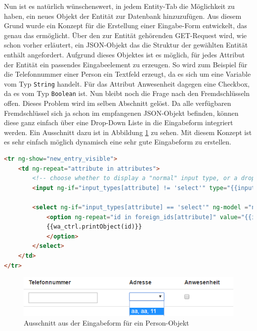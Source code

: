 Nun ist es natürlich wünschenswert, in jedem Entity-Tab die Möglichkeit zu haben, ein neues Objekt der Entität zur Datenbank hinzuzufügen. Aus diesem Grund wurde ein Konzept für die Erstellung einer Eingabe-Form entwickelt, das genau das ermöglicht. Über den zur Entität gehörenden GET-Request wird, wie schon vorher erläutert, ein JSON-Objekt das die Struktur der gewählten Entität enthält angefordert. Aufgrund dieses Objektes ist es möglich, für jedes Attribut der Entität ein passendes Eingabeelement zu erzeugen. So wird zum Beispiel für die Telefonnummer einer Person ein Textfeld erzeugt, da es sich um eine Variable vom Typ \verb|String| handelt. Für das Attribut Anwesenheit dagegen eine Checkbox, da es vom Typ \verb|Boolean| ist. Nun bleibt noch die Frage nach den Fremdschlüsseln offen. Dieses Problem wird im selben Abschnitt gelöst. Da alle verfügbaren Fremdschlüssel sich ja schon im empfangenen JSON-Objekt befinden, können diese ganz einfach über eine Drop-Down Liste in die Eingabeform integriert werden. Ein Ausschnitt dazu ist in Abbildung \ref{fig:input_form} zu sehen. Mit diesem Konzept ist es sehr einfach möglich dynamisch eine sehr gute Eingabeform zu erstellen.

\scriptsize
\begin{lstlisting}[caption=Erstellung der Eingabeform in index.html, label=cs:input_form, language=HTML]
<tr ng-show="new_entry_visible">
	<td ng-repeat="attribute in attributes">
		<!-- choose whether to display a "normal" input type, or a dropdown-list-->
		<input ng-if="input_types[attribute] != 'select'" type="{{input_types[attribute]}}" name="{{attribute}}" ng-model="new_db_object[attribute]" />
		
		<select ng-if="input_types[attribute] == 'select'" ng-model ="new_db_object[attribute]">
			<option ng-repeat="id in foreign_ids[attribute]" value="{{id}}">
			{{wa_ctrl.printObject(id)}}
			</option>
		</select>
	</td>
</tr>
\end{lstlisting}
\normalsize 

\begin{figure}[h]
\centering
\includegraphics[width=0.7\linewidth]{4_frontend/pics/input_form}
\caption{Ausschnitt aus der Eingabeform für ein Person-Objekt}
\label{fig:input_form}
\end{figure}


